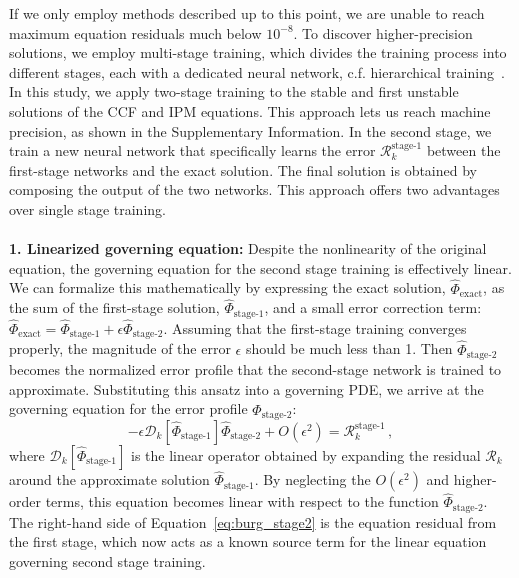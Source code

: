 \documentclass[fleqn,11pt]{wlscirep}
\begin{document}
If we only employ methods described up to this point, we are unable to reach maximum equation residuals much below $10^{-8}$. To discover higher-precision solutions, we employ multi-stage training\cite{Wang-Lai:multistage-nn}, which divides the training process into different stages, each with a dedicated neural network, c.f. hierarchical training~\cite{trask2022hierarchical, howard2023stacked}.
In this study, we apply two-stage training to the stable and first unstable solutions of the CCF and IPM equations. This approach lets us reach machine precision, as shown in the Supplementary Information. In the second stage, we train a new neural network that specifically learns the error $\mathcal{R}^\text{stage-1}_k$ between the first-stage networks and the exact solution. The final solution is obtained by composing the output of the two networks. This approach offers two advantages over single stage training. \\
\\
{\bf 1. Linearized governing equation:} Despite the nonlinearity of the original equation, the governing equation for the second stage training is effectively linear. We can formalize this mathematically by expressing the exact solution, $\hat{\Phi}_\text{exact}$, as the sum of the first-stage solution, $\hat{\Phi}_\text{stage-1}$, and a small error correction term: $\hat{\Phi}_\text{exact} = \hat{\Phi}_\text{stage-1} + \epsilon \hat{\Phi}_\text{stage-2}$. Assuming that the first-stage training converges properly, the magnitude of the error $\epsilon$ should be much less than 1. Then $\hat{\Phi}_\text{stage-2}$ becomes the normalized error profile that the second-stage network is trained to approximate. Substituting this ansatz into a governing PDE, we arrive at the governing equation for the error profile $\hat{\Phi}_\text{stage-2}$:
\begin{equation}\label{eq:burg_stage2}
	-\epsilon \mathcal{D}_k[\hat{\Phi}_\text{stage-1}] \hat{\Phi}_\text{stage-2} + O(\epsilon^2) = \mathcal{R}^\text{stage-1}_k \,,
\end{equation}
where $\mathcal{D}_k[\hat{\Phi}_\text{stage-1}]$ is the linear operator obtained by expanding the residual $\mathcal{R}_k$ around the approximate solution $\hat{\Phi}_\text{stage-1}$. By neglecting the $O(\epsilon^2)$ and higher-order terms, this equation becomes linear with respect to the function $\hat{\Phi}_\text{stage-2}$. The right-hand side of Equation~\eqref{eq:burg_stage2} is the equation residual from the first stage, which now acts as a known source term for the linear equation governing second stage training.\\
\end{document}
